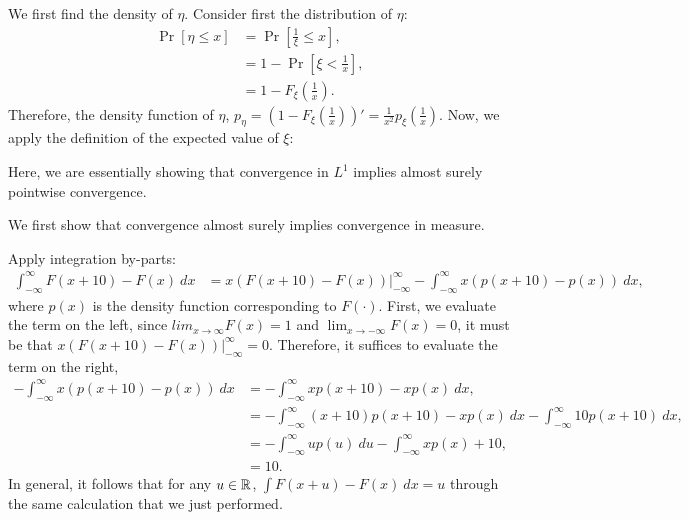 \begin{problem}{6}
\end{problem}
\begin{solution}
    We first find the density of $\eta$. Consider first the distribution of $\eta$:
    \begin{align*}
        \Pr[\eta \leq x] &= \Pr\left[\frac{1}{\xi} \leq x\right], \\
        &= 1 - \Pr\left[\xi < \frac{1}{x}\right], \\
        &= 1 - F_\xi\left(\frac{1}{x}\right).
    \end{align*}
    Therefore, the density function of $\eta$, $p_\eta = \left(1-F_\xi\left(\frac{1}{x}\right)\right)' = \frac{1}{x^2}p_\xi\left(\frac{1}{x}\right)$. Now, we apply the definition of the expected value of $\xi$:
\end{solution}

\begin{problem}{7}
\end{problem}
\begin{solution}
    Here, we are essentially showing that convergence in $L^1$ implies almost surely pointwise convergence. 
\end{solution}

\begin{problem}{8}
\end{problem}
\begin{solution}
    We first show that convergence almost surely implies convergence in measure. 
\end{solution}

\begin{problem}{9}
\end{problem}
\begin{solution}
    Apply integration by-parts:
    \begin{align*}
        \int_{-\infty}^\infty F(x+10) - F(x)~dx &= x(F(x+10) - F(x)) \Big\vert_{-\infty}^\infty - \int_{-\infty}^\infty x(p(x+10) - p(x))~dx, 
    \end{align*}
    where $p(x)$ is the density function corresponding to $F(\cdot)$. First, we evaluate the term on the left, since $lim_{x\to\infty} F(x) = 1$ and $\lim_{x\to-\infty} F(x) = 0$, it must be that $x(F(x+10) - F(x)) \Big\vert_{-\infty}^\infty = 0$. Therefore, it suffices to evaluate the term on the right, 
    \begin{align*}
        -\int_{-\infty}^\infty x(p(x+10) - p(x))~dx &= -\int_{-\infty}^\infty xp(x+10) - xp(x)~dx, \\
        &= -\int_{-\infty}^\infty (x+10)p(x+10) - xp(x)~dx - \int_{-\infty}^\infty 10p(x+10)~dx, \\
        &= -\int_{-\infty}^\infty up(u)~du - \int_{-\infty}^\infty xp(x) + 10, \\
        &= 10.
    \end{align*}
    In general, it follows that for any $u \in \mathbb{R}$, $\int F(x + u) - F(x)~dx = u$ through the same calculation that we just performed. 
\end{solution}

